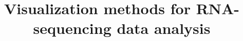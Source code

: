 \documentclass[referee]{biom}
\title[Visualization methods for RNA-sequencing data analysis]{Visualization methods for RNA-sequencing data analysis}
\begin{document}





\label{firstpage}


%
\end{document}

